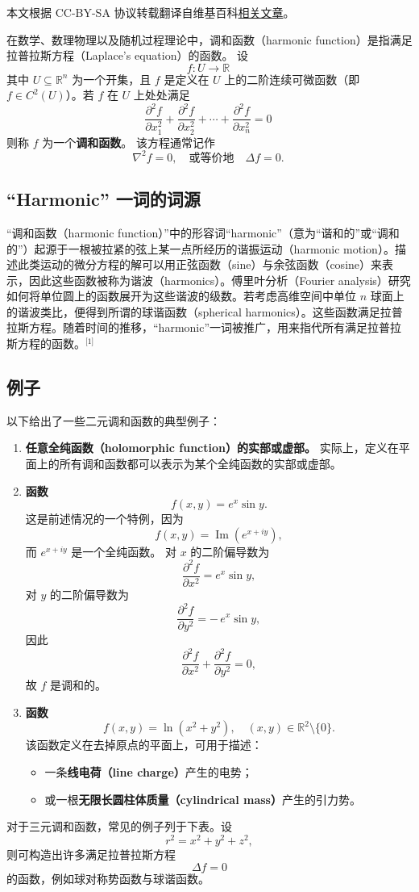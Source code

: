 
本文根据 CC-BY-SA 协议转载翻译自维基百科\href{https://en.wikipedia.org/wiki/Harmonic_function}{相关文章}。


在数学、数理物理以及随机过程理论中，调和函数（harmonic function）是指满足拉普拉斯方程（Laplace's equation）的函数。  
设
\[
f : U \to \mathbb{R}~
\]
其中 \(U \subseteq \mathbb{R}^n\) 为一个开集，且 \(f\) 是定义在 \(U\) 上的二阶连续可微函数（即 \(f \in C^2(U)\)）。若 \(f\) 在 \(U\) 上处处满足
\[
\frac{\partial^2 f}{\partial x_1^2}
+ \frac{\partial^2 f}{\partial x_2^2}
+ \cdots
+ \frac{\partial^2 f}{\partial x_n^2}
= 0~
\]
则称 \(f\) 为一个\textbf{调和函数}。  
该方程通常记作
\[
\nabla^2 f = 0,
\quad \text{或等价地} \quad
\Delta f = 0.~
\]
\subsection{“Harmonic” 一词的词源}
“调和函数（harmonic function）”中的形容词“harmonic”（意为“谐和的”或“调和的”）起源于一根被拉紧的弦上某一点所经历的谐振运动（harmonic motion）。描述此类运动的微分方程的解可以用正弦函数（sine）与余弦函数（cosine）来表示，因此这些函数被称为谐波（harmonics）。傅里叶分析（Fourier analysis）研究如何将单位圆上的函数展开为这些谐波的级数。若考虑高维空间中单位 \(n\) 球面上的谐波类比，便得到所谓的球谐函数（spherical harmonics）。这些函数满足拉普拉斯方程。随着时间的推移，“harmonic”一词被推广，用来指代所有满足拉普拉斯方程的函数。\(^\text{[1]}\)  
\subsection{例子}
以下给出了一些二元调和函数的典型例子：
\begin{enumerate}
  \item \textbf{任意全纯函数（holomorphic function）的实部或虚部。}  
  实际上，定义在平面上的所有调和函数都可以表示为某个全纯函数的实部或虚部。

  \item \textbf{函数}
  \[
  f(x, y) = e^{x} \sin y.
  \]
  这是前述情况的一个特例，因为
  \[
  f(x, y) = \operatorname{Im}\!\left(e^{x + i y}\right),
  \]
  而 \( e^{x + i y} \) 是一个全纯函数。  
  对 \(x\) 的二阶偏导数为
  \[
  \frac{\partial^2 f}{\partial x^2} = e^{x} \sin y,
  \]
  对 \(y\) 的二阶偏导数为
  \[
  \frac{\partial^2 f}{\partial y^2} = -\, e^{x} \sin y,
  \]
  因此
  \[
  \frac{\partial^2 f}{\partial x^2} + \frac{\partial^2 f}{\partial y^2} = 0,
  \]
  故 \(f\) 是调和的。

  \item \textbf{函数}
  \[
  f(x, y) = \ln\!\left(x^2 + y^2\right),
  \quad (x, y) \in \mathbb{R}^2 \setminus \{0\}.
  \]
  该函数定义在去掉原点的平面上，可用于描述：
  \begin{itemize}
    \item 一条\textbf{线电荷（line charge）}产生的电势；
    \item 或一根\textbf{无限长圆柱体质量（cylindrical mass）}产生的引力势。
  \end{itemize}
\end{enumerate}

\vspace{1em}
\noindent
对于三元调和函数，常见的例子列于下表。设
\[
r^2 = x^2 + y^2 + z^2,
\]
则可构造出许多满足拉普拉斯方程
\[
\Delta f = 0
\]
的函数，例如球对称势函数与球谐函数。
